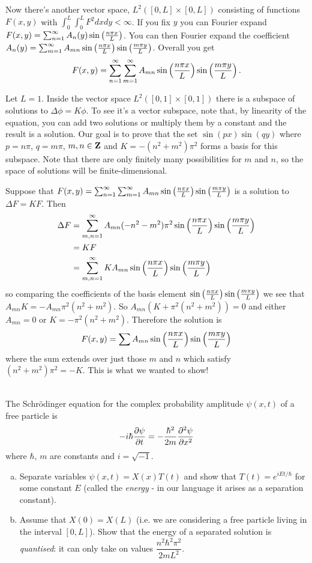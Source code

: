 \documentclass[12pt]{article}
\begin{document}
\begin{answer}
{Now there's another vector space, $L^2([0,L]\times [0,L])$ consisting of functions $F(x,y)$ with $\int_0^L\int_0^LF^2dxdy<\infty$. If you fix $y$ you can Fourier expand $F(x,y)=\sum_{n=1}^{\infty}A_n(y)\sin\left(\frac{n \pi x}{L}\right)$. You can then Fourier expand the coefficient $A_n(y)=\sum_{m=1}^{\infty}A_{mn}\sin\left(\frac{n \pi x}{L}\right)\sin\left(\frac{m\pi y}{L}\right)$. Overall you get
\[F(x,y)=\sum_{n=1}^{\infty}\sum_{m=1}^{\infty}A_{mn}\sin\left(\frac{n \pi x}{L}\right)\sin\left(\frac{m\pi y}{L}\right).\]

Let $L=1$. Inside the vector space $L^2([0,1]\times [0,1])$ there is a subspace of solutions to $\Delta\phi=K\phi$. To see it's a vector subspace, note that, by linearity of the equation, you can add two solutions or multiply them by a constant and the result is a solution. Our goal is to prove that the set $\sin(px)\sin(qy)$ where $p=n\pi$, $q=m\pi$, $m,n\in\mathbf{Z}$ and $K=-(n^2+m^2)\pi^2$ forms a basis for this subspace. Note that there are only finitely many possibilities for $m$ and $n$, so the space of solutions will be finite-dimensional.

Suppose that $F(x,y)=\sum_{n=1}^{\infty}\sum_{m=1}^{\infty}A_{mn}\sin\left(\frac{n \pi x}{L}\right)\sin\left(\frac{m\pi y}{L}\right)$ is a solution to $\Delta F=KF$. Then
\begin{align*}
\Delta F&=\sum_{m,n=1}^{\infty}A_{mn}(-n^2-m^2)\pi^2\sin\left(\frac{n \pi x}{L}\right)\sin\left(\frac{m\pi y}{L}\right)\\
        &=KF\\
        &=\sum_{m,n=1}^{\infty}KA_{mn}\sin\left(\frac{n \pi x}{L}\right)\sin\left(\frac{m\pi y}{L}\right)
\end{align*}
so comparing the coefficients of the basis element $\sin\left(\frac{n \pi x}{L}\right)\sin\left(\frac{m\pi y}{L}\right)$ we see that $A_{mn}K=-A_{mn}\pi^2(n^2+m^2)$. So $A_{mn}(K+\pi^2(n^2+m^2))=0$ and either $A_{mn}=0$ or $K=-\pi^2(n^2+m^2)$. Therefore the solution is
\[F(x,y)=\sum A_{mn}\sin\left(\frac{n \pi x}{L}\right)\sin\left(\frac{m\pi y}{L}\right)\]
where the sum extends over just those $m$ and $n$ which satisfy $(n^2+m^2)\pi^2=-K$. This is what we wanted to show!
}
\end{answer}
\newpage
\fi

\vspace{0.5cm}

\begin{question}\ \\
The Schr\"{o}dinger equation for the complex probability amplitude $\psi(x,t)$ of a free particle is
\[-i\hbar\dfrac{\partial \psi}{\partial t}=-\frac{\hbar^2}{2m}\dfrac{\partial^2 \psi}{\partial x^2}\]
where $\hbar$, $m$ are constants and $i=\sqrt{-1}$.

\begin{enumerate}[(a)]
\item Separate variables $\psi(x,t)=X(x)T(t)$ and show that $T(t)=e^{iEt/\hbar}$ for some constant $E$ (called the {\em energy} - in our language it arises as a separation constant).
\item Assume that $X(0)=X(L)$ (i.e. we are considering a free particle living in the interval $[0,L]$). Show that the energy of a separated solution is {\em quantised}: it can only take on values $\dfrac{n^2\hbar^2\pi^2}{2mL^2}$.
\end{enumerate}
\end{question}
\end{document}
